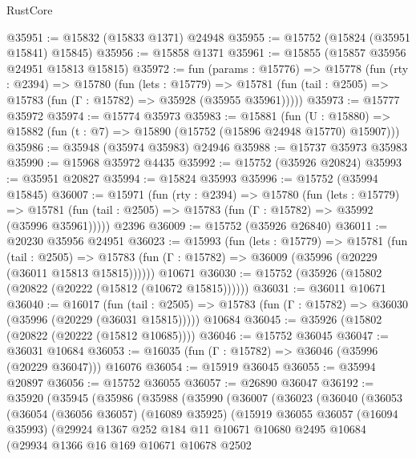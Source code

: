 \begin{lexlean}{RustCore}
\begin{coremodule}
@35951 := @15832 (@15833 @1371) @24948
@35955 := @15752 (@15824 (@35951 @15841) @15845)
@35956 := @15858 @1371
@35961 := @15855 (@15857 @35956 @24951 @15813 @15815)
@35972 := fun (params : @15776) =>
  @15778
    (fun (rty : @2394) =>
    @15780
      (fun (lets : @15779) =>
      @15781 (fun (tail : @2505) => @15783 (fun (Γ : @15782) => @35928 (@35955 @35961)))))
@35973 := @15777 @35972
@35974 := @15774 @35973
@35983 := @15881
    (fun (U : @15880) => @15882 (fun (t : @7) => @15890 (@15752 (@15896 @24948 @15770) @15907)))
@35986 := @35948 (@35974 @35983) @24946
@35988 := @15737 @35973 @35983
@35990 := @15968 @35972 @4435
@35992 := @15752 (@35926 @20824)
@35993 := @35951 @20827
@35994 := @15824 @35993
@35996 := @15752 (@35994 @15845)
@36007 := @15971
    (fun (rty : @2394) =>
    @15780
      (fun (lets : @15779) =>
      @15781 (fun (tail : @2505) => @15783 (fun (Γ : @15782) => @35992 (@35996 @35961)))))
    @2396
@36009 := @15752 (@35926 @26840)
@36011 := @20230 @35956 @24951
@36023 := @15993
    (fun (lets : @15779) =>
    @15781
      (fun (tail : @2505) =>
      @15783 (fun (Γ : @15782) => @36009 (@35996 (@20229 (@36011 @15813 @15815))))))
    @10671
@36030 := @15752 (@35926 (@15802 (@20822 (@20222 (@15812 (@10672 @15815))))))
@36031 := @36011 @10671
@36040 := @16017
    (fun (tail : @2505) => @15783 (fun (Γ : @15782) => @36030 (@35996 (@20229 (@36031 @15815)))))
    @10684
@36045 := @35926 (@15802 (@20822 (@20222 (@15812 @10685))))
@36046 := @15752 @36045
@36047 := @36031 @10684
@36053 := @16035 (fun (Γ : @15782) => @36046 (@35996 (@20229 @36047))) @16076
@36054 := @15919 @36045
@36055 := @35994 @20897
@36056 := @15752 @36055
@36057 := @26890 @36047
@36192 := @35920
    (@35945
      (@35986
        (@35988
          (@35990
            (@36007
              (@36023
                (@36040
                  (@36053
                    (@36054
                      (@36056 @36057)
                      (@16089 @35925)
                      (@15919
                        @36055
                        @36057
                        (@16094 @35993)
                        (@29924
                          @1367
                          @252
                          @184
                          @11
                          @10671
                          @10680
                          @2495
                          @10684
                          (@29934
                            @1366
                            @16
                            @169
                            @10671
                            @10678
                            @2502

\end{coremodule}
\end{lexlean}
